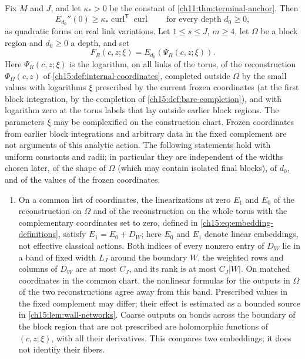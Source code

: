 \begin{theorem}\label{ch15:thm:regional-gap-and-center}
Fix $M$ and $J$, and let $\kappa_*>0$ be the constant of \cref{ch11:thm:terminal-anchor}. Then
\begin{equation}\label{ch15:eq:flat-floor}
 E_{d_0}''(0)\ge\kappa_*\operatorname{curl}^{\mathsf T}\operatorname{curl}
 \qquad\text{for every depth }d_0\ge0,
\end{equation}
as quadratic forms on real link variations. Let $1\le s\le J$, $m\ge4$, let $\Omega$ be a block region and $d_0\ge0$ a depth, and set
\[
 F_R(c,z;\xi)=E_{d_0}(\Psi_R(c,z;\xi)).
\]
Here $\Psi_R(c,z;\xi)$ is the logarithm, on all links of the torus, of the reconstruction $\Phi_\Omega(c,z)$ of \cref{ch15:def:internal-coordinates}, completed outside $\Omega$ by the small values with logarithms $\xi$ prescribed by the current frozen coordinates (at the first block integration, by the completion of \cref{ch15:def:bare-completion}), and with logarithm zero at the torus labels that lay outside earlier block regions. The parameters $\xi$ may be complexified on the construction chart. Frozen coordinates from earlier block integrations and arbitrary data in the fixed complement are not arguments of this analytic action. The following statements hold with uniform constants and radii; in particular they are independent of the widths chosen later, of the shape of $\Omega$ (which may contain isolated final blocks), of $d_0$, and of the values of the frozen coordinates.
\begin{enumerate}
\item On a common list of coordinates, the linearizations at zero $E_1$ and $E_0$ of the reconstruction on $\Omega$ and of the reconstruction on the whole torus with the complementary coordinates set to zero, defined in \eqref{ch15:eq:embedding-definitions}, satisfy $E_1=E_0+D_W$; here $E_0$ and $E_1$ denote linear embeddings, not effective classical actions. Both indices of every nonzero entry of $D_W$ lie in a band of fixed width $L_J$ around the boundary $W$, the weighted rows and columns of $D_W$ are at most $C_J$, and its rank is at most $C_J|W|$. On matched coordinates in the common chart, the nonlinear formulas for the outputs in $\Omega$ of the two reconstructions agree away from this band. Prescribed values in the fixed complement may differ; their effect is estimated as a bounded source in \cref{ch15:lem:wall-networks}. Coarse outputs on bonds across the boundary of the block region that are not prescribed are holomorphic functions of $(c,z;\xi)$, with all their derivatives. This compares two embeddings; it does not identify their fibers.

\end{enumerate}
\end{theorem}
